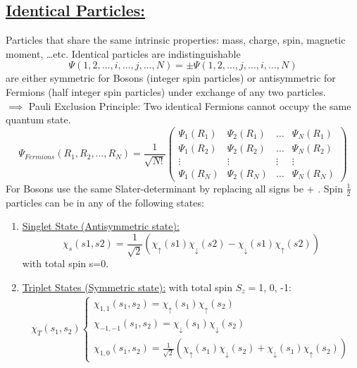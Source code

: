 \documentclass[a4paper,12pt]{article}
\begin{document}
\subsection*{\underline{Identical Particles:}}
Particles that share the same intrinsic properties: mass, charge, spin, magnetic moment, \dots etc. Identical particles are indistinguishable
\begin{equation}
    \Psi(1, 2, \dots, i, \dots, j, \dots, N)=\pm\Psi(1, 2, \dots, j, \dots, i, \dots, N)
\end{equation}
are either symmetric for Bosons (integer spin particles) or antisymmetric for Fermions (half integer spin particles) under exchange of any two particles.\\
$\implies$ Pauli Exclusion Principle: Two identical Fermions cannot occupy the same quantum state.
\begin{equation}
    \Psi_{Fermions}(R_1,R_2,\dots,R_N)= \frac{1}{\sqrt{N!}}
    \left(\begin{matrix}
            \Psi_1(R_1) & \Psi_2(R_1) & \dots  & \Psi_N(R_1) \\
            \Psi_1(R_2) & \Psi_2(R_2) & \dots  & \Psi_N(R_2) \\
            \vdots      & \vdots      & \vdots & \vdots      \\
            \Psi_1(R_N) & \Psi_2(R_N) & \dots  & \Psi_N(R_N)
        \end{matrix}\right)
\end{equation}
For Bosons use the same Slater-determinant by replacing all signs be + .
Spin $\frac{1}{2}$ particles can be in any of the following states:
\begin{enumerate}
    \item[] \underline{Singlet State (Antisymmetric state):} \begin{equation} \chi_s(s1,s2)=\frac{1}{\sqrt{2}}(\chi_{\uparrow}(s1)\chi_{\downarrow}(s2)-\chi_{\downarrow}(s1)\chi_{\uparrow}(s2)) \end{equation} with total spin s=0.
    \item[] \underline{Triplet States (Symmetric state):} with total spin $S_z=$1, 0, -1:
        \begin{gather}
            \chi_T(s_1, s_2) 
            \begin{cases}
                \chi_{1,1}(s_1,s_2)=\chi_{\uparrow}(s_1)\chi_{\uparrow}(s_2)       \\
                \chi_{-1,-1}(s_1,s_2)=\chi_{\downarrow}(s_1)\chi_{\downarrow}(s_2) \\
                \chi_{1,0}(s_1,s_2)=\frac{1}{\sqrt{2}}(\chi_{\uparrow}(s_1)\chi_{\downarrow}(s_2)+\chi_{\downarrow}(s_1)\chi_{\uparrow}(s_2))
            \end{cases}
        \end{gather}
\end{enumerate}
\end{document}
